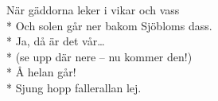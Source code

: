 \begin{SongText}
    \begin{SongVerse}
        När gäddorna leker i vikar och vass\\*%
        Och solen går ner bakom Sjöbloms dass.\\*%
        Ja, då är det vår…\\*%
        (se upp där nere – nu kommer den!)\\*%
        Å helan går!\\*%
        Sjung hopp fallerallan lej.
    \end{SongVerse}
\end{SongText}

